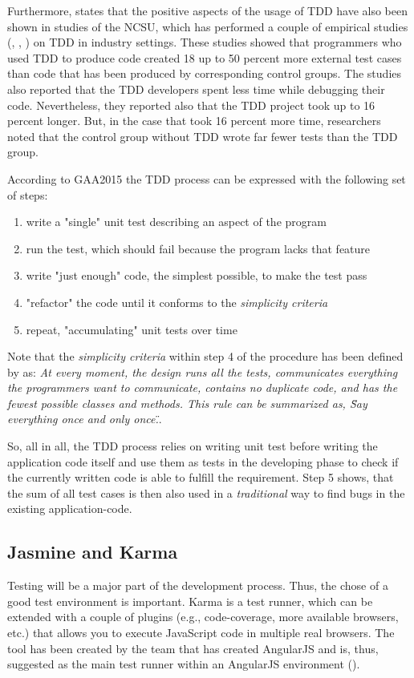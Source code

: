 Furthermore, \cite{Janzen2005} states that the positive aspects of the usage of \ac{TDD} have also been shown in studies of the \ac{NCSU}, which has performed a couple of empirical studies (\cite{George2004}, \cite{max03}, \cite{Williams2003}) on TDD in industry settings.
These studies showed that programmers who used \ac{TDD} to produce code created 18 up to 50 percent more external test cases than code that has been produced by corresponding control groups. The studies also reported that the \ac{TDD} developers spent less time while debugging their code. Nevertheless, they reported also that the \ac{TDD} project took up to 16 percent longer. But, in the case that took 16 percent more time, researchers noted that the control group without \ac{TDD} wrote far fewer tests than the \ac{TDD} group. 

According to \ac{GAA2015} the \ac{TDD} process can be expressed with the following set of steps:

\begin{enumerate}
  	\item write a "single" unit test describing an aspect of the program
  	\item run the test, which should fail because the program lacks that feature
  	\item write "just enough" code, the simplest possible, to make the test pass
	\item "refactor" the code until it conforms to the \textit{simplicity criteria}
	\item repeat, "accumulating" unit tests over time
\end{enumerate}

Note that the \textit{simplicity criteria} within step 4 of the procedure has been defined by \cite{Beck1999} as: \textit{At every moment, the design runs all the tests, communicates everything the programmers want to communicate, contains no duplicate code, and has the fewest possible classes and methods. This rule can be summarized as, \"Say everything once and only once.\"}. 

So, all in all, the \ac{TDD} process relies on writing unit test before writing the application code itself and use them as tests in the developing phase to check if the currently written code is able to fulfill the requirement. Step 5 shows, that the sum of all test cases is then also used in a \textit{traditional} way to find bugs in the existing application-code. 

\subsection{Jasmine and Karma}
Testing will be a major part of the development process. Thus, the chose of a good test environment is important. Karma is a test runner, which can be extended with a couple of plugins (e.g., code-coverage, more available browsers, etc.) that allows you to execute JavaScript code in multiple real browsers. The tool has been created by the team that has created AngularJS and is, thus, suggested as the main test runner within an AngularJS environment (\cite{7_github_2015}).  

